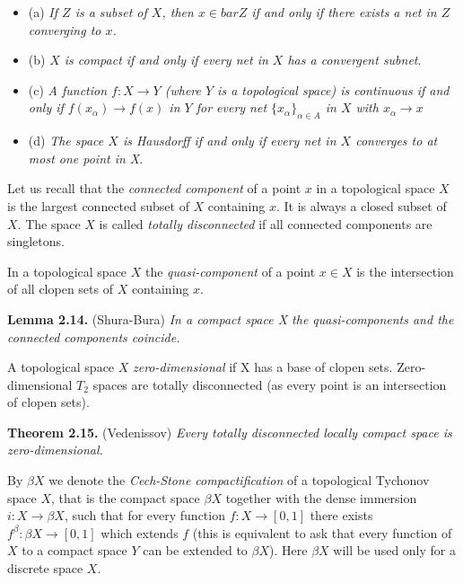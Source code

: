 \documentclass[12pt]{article}
\begin{document}
    \begin{itemize}

        \item (a) \emph{If $ Z $ is a subset of $ X $, then $ x \in bar{Z} $ if and only if there exists a net in $ Z $ converging to $ x $.}
            
        \item (b) \emph{$ X $ is compact if and only if every net in $ X $ has a convergent subnet}.

        \item (c) \emph{A function $ f : X \to Y $ (where $ Y $ is a topological space) is continuous if and only if $ f(x_{\alpha}) \to f(x) $ in $ Y $ for 
        every net $ \{ x_{\alpha} \}_{\alpha \in A} $ in $ X $ with $ x_{\alpha} \to x $}

        \item (d) \emph{The space $ X $ is Hausdorff if and only if every net in $ X $ converges to at most one point in X}.
            
    \end{itemize}


    Let us recall that the \emph{connected component} of a point $ x $ in a topological space $ X $ is the largest connected
subset of $ X $ containing $ x $. It is always a closed subset of $ X $. The space $ X $ is called \emph{totally disconnected} if all
connected components are singletons.
    
    
    In a topological space $ X $ the \emph{quasi-component} of a point $ x \in X $ is the intersection of all clopen sets of $ X $
containing $ x $. 


\textbf{Lemma 2.14.} (Shura-Bura) \emph{In a compact space X the quasi-components and the connected components coincide.}


    A topological space $ X $ \emph{zero-dimensional} if X has a base of clopen sets. Zero-dimensional $ T_2 $ spaces are totally
disconnected (as every point is an intersection of clopen sets).


\textbf{Theorem 2.15.} (Vedenissov) \emph{Every totally disconnected locally compact space is zero-dimensional.}


    By $\beta X$ we denote the \emph{Cech-Stone compactification} of a topological Tychonov space $ X $, that is the compact
space $\beta X$ together with the dense immersion $i : X \to \beta X$, such that for every function $f : X \to [0, 1]$ there
exists $f^{\beta} : \beta X → [0, 1]$ which extends $ f $ (this is equivalent to ask that every function of $ X $ to a compact space
$ Y $ can be extended to $\beta X$). Here $\beta X$ will be used only for a discrete space $ X $.
\end{document}
